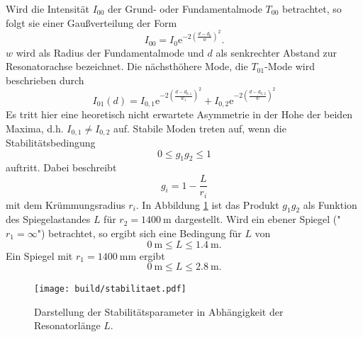 Wird die Intensität $I_{00}$ der Grund- oder Fundamentalmode $T_{00}$ betrachtet, so
folgt sie einer Gaußverteilung der Form
\begin{equation}
  I_{00} = I_0 \text{e}^{-2\left(\frac{d-d_0}{w}\right)^2}.
  \label{eqn:t00}
\end{equation}
$w$ wird als Radius der Fundamentalmode und $d$ als senkrechter Abstand zur Resonatorachse
bezeichnet. Die nächsthöhere Mode, die $T_{01}$-Mode wird beschrieben durch
\begin{equation}
  I_{01}(d) = I_{0,1}\text{e}^{-2\left(\frac{d-d_{0,1}}{w_1}\right)^2}+I_{0,2}\text{e}^{-2\left(\frac{d-d_{0,2}}{w}\right)^2}
\label{eqn:t10}
\end{equation}
Es tritt hier eine heoretisch nicht erwartete Asymmetrie in der Hohe der beiden Maxima,
d.h. $I_{0,1} \neq I_{0,2}$ auf.
Stabile Moden treten auf, wenn die Stabilitätsbedingung
\begin{equation}
  0\leq g_1g_2\leq 1
\end{equation}
auftritt. Dabei beschreibt
\begin{equation}
  g_i = 1 - \frac{L}{r_i}
\end{equation}
mit dem Krümmungsradius $r_i$. In Abbildung \ref{fig:stabilität} ist das Produkt $g_1g_2$
als Funktion des Spiegelastandes $L$  für $r_2 = \SI{1400}{\metre}$ dargestellt. Wird ein
ebener Spiegel ("$r_1 = \infty$") betrachtet, so ergibt sich eine Bedingung für
$L$ von
\begin{equation}
  \SI{0}{\metre} \leq L \leq \SI{1.4}{\metre}.
\end{equation}
Ein Spiegel mit $r_1 = \SI{1400}{\milli\metre}$ ergibt
\begin{equation}
    \SI{0}{\metre} \leq L \leq \SI{2.8}{\metre}.
\end{equation}

\begin{figure}
  \centering
  \texttt{[image: build/stabilitaet.pdf]}
  \caption{Darstellung der Stabilitätsparameter in Abhängigkeit der
  Resonatorlänge $L$.}
  \label{fig:stabilität}
\end{figure}

